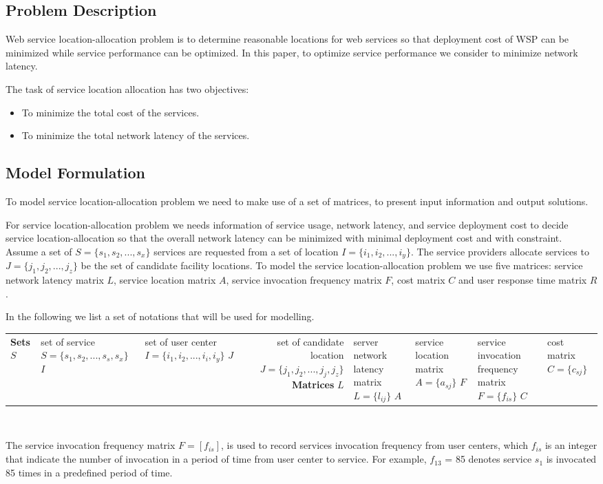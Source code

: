 \documentclass{llncs}
\begin{document}
\subsection{Problem Description}
Web service location-allocation problem is to determine reasonable locations for web services so that deployment cost of WSP can be minimized while service performance can be optimized.
In this paper, to optimize service performance we consider to minimize network latency.

The task of service location allocation has two objectives:
\begin{itemize}
	\item To minimize the total cost of the services.
	\item To minimize the total network latency of the services.
\end{itemize}


\subsection{Model Formulation}
To model service location-allocation problem we need to make use of a set of matrices, to present input information and output solutions. 

For service location-allocation problem we needs information of service usage, network latency, and service deployment cost to decide service location-allocation so that the overall network latency can be minimized with minimal deployment cost and with constraint.
Assume a set of $S = \{ s_{1}, s_{2}, ..., s_{x}\}$ services are
requested from a set of location $I = \{ i_{1}, i_{2}, ..., i_{y} \}$. The service providers allocate services 
to $J = \{ j_{1}, j_{2}, ..., j_{z} \}$ be the set of candidate facility locations.
To model the service location-allocation problem we use five matrices: 
service network latency matrix $L$, service location
matrix $A$, service invocation frequency matrix $F$, cost matrix $C$ and user response time matrix $R$.

In the following we list a set of notations that will be used for modelling. 
{
\centering
	\begin{tabular}{l*{2}{l}r}
		\hline
		\textbf{Sets} \cr
		$S$	& set of service $S = \{s_{1}, s_{2}, ..., s_{s}, s_{x}\}$ \cr
		$I$	& set of user center $I = \{i_{1}, i_{2}, ..., i_{i}, i_{y}\}$ \cr
		$J$	& set of candidate location $J = \{j_{1}, j_{2}, ..., j_{j}, j_{z}\}$ \cr
		\textbf{Matrices} \cr
		$L$ & server network latency matrix $L = \{l_{ij}\}$ \cr
		$A$ & service location matrix $A = \{a_{sj}\}$ \cr
		$F$ & service invocation frequency matrix $F = \{f_{is}\}$ \cr
		$C$ & cost matrix $C = \{c_{sj}\}$ \cr
		\hline
	\end{tabular}
\\
}
The service invocation frequency matrix $F= [f_{is}]$, is used to record services invocation frequency from user centers, 
which $f_{is}$ is an integer that indicate the number of invocation in a period of time from user center to service. 
For example, $f_{13}$ = 85 denotes service $s_{1}$ is invocated 85 times in a predefined period of time.
\end{document}

